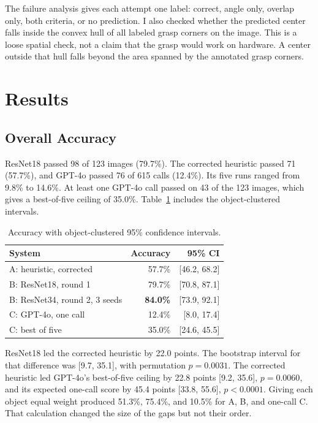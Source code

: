 \documentclass[10pt,conference]{IEEEtran}
\begin{document}
The failure analysis gives each attempt one label: correct, angle only,
overlap only, both criteria, or no prediction. I also checked whether the
predicted center falls inside the convex hull of all labeled grasp corners on
the image. This is a loose spatial check, not a claim that the grasp would
work on hardware. A center outside that hull falls beyond the area spanned by
the annotated grasp corners.

\section{Results}

\subsection{Overall Accuracy}

ResNet18 passed 98 of 123 images (79.7\%). The corrected heuristic passed 71
(57.7\%), and GPT-4o passed 76 of 615 calls (12.4\%). Its five runs ranged
from 9.8\% to 14.6\%. At least one GPT-4o call passed on 43 of the 123 images,
which gives a best-of-five ceiling of 35.0\%. Table~\ref{tab:accuracy} includes
the object-clustered intervals.

\begin{table}[t]
\caption{Accuracy with object-clustered 95\% confidence intervals.}
\label{tab:accuracy}
\centering
\begin{tabular}{lrr}
\toprule
System & Accuracy & 95\% CI \\
\midrule
A: heuristic, corrected & 57.7\% & [46.2, 68.2] \\
B: ResNet18, round 1 & 79.7\% & [70.8, 87.1] \\
B: ResNet34, round 2, 3 seeds & \textbf{84.0\%} & [73.9, 92.1] \\
C: GPT-4o, one call & 12.4\% & [8.0, 17.4] \\
C: best of five & 35.0\% & [24.6, 45.5] \\
\bottomrule
\end{tabular}
\end{table}

ResNet18 led the corrected heuristic by 22.0 points. The bootstrap interval
for that difference was [9.7, 35.1], with permutation $p=0.0031$. The
corrected heuristic led GPT-4o's best-of-five ceiling by 22.8 points [9.2,
35.6], $p=0.0060$, and its expected one-call score by 45.4 points [33.8,
55.6], $p<0.0001$. Giving each object equal weight produced 51.3\%, 75.4\%,
and 10.5\% for A, B, and one-call C. That calculation changed the size of the
gaps but not their order.
\end{document}
